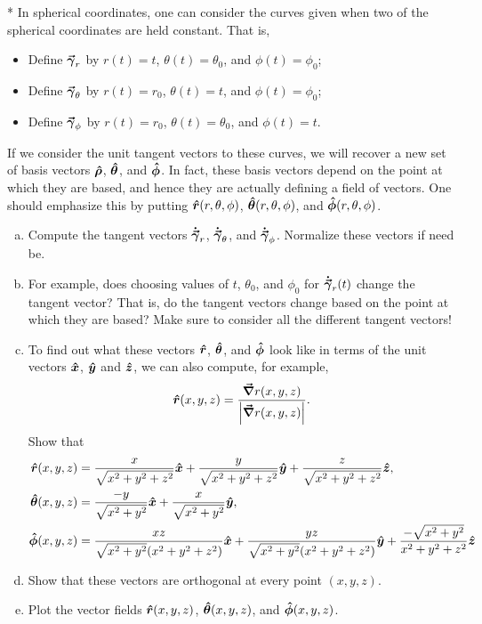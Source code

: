 \documentclass[12pt]{article} %
\begin{document}
\vspace*{1cm}
\begin{problem}
* In spherical coordinates, one can consider the curves given when two of the spherical coordinates are held constant.  That is, 
\begin{itemize}
    \item Define $\boldsymbol{\vec{\gamma}}_r$ by $r(t)=t$, $\theta(t)=\theta_0$, and $\phi(t)=\phi_0$;
    \item Define $\boldsymbol{\vec{\gamma}}_\theta$ by $r(t)=r_0$, $\theta(t)=t$, and $\phi(t)=\phi_0$;
    \item Define $\boldsymbol{\vec{\gamma}}_\phi$ by $r(t)=r_0$, $\theta(t)=\theta_0$, and $\phi(t)=t$.
\end{itemize}
If we consider the unit tangent vectors to these curves, we will recover a new set of basis vectors $\boldsymbol{\boldsymbol{\hat{\rho}}}$, $\boldsymbol{\boldsymbol{\hat{\theta}}}$, and $\boldsymbol{\boldsymbol{\hat{\phi}}}$.  In fact, these basis vectors depend on the point at which they are based, and hence they are actually defining a field of vectors.  One should emphasize this by putting $\boldsymbol{\boldsymbol{\hat{r}}}(r,\theta,\phi)$, $\boldsymbol{\boldsymbol{\hat{\theta}}}(r,\theta,\phi)$, and $\boldsymbol{\boldsymbol{\hat{\phi}}}(r,\theta,\phi)$.
\begin{enumerate}[(a)]
    \item Compute the tangent vectors $\boldsymbol{\dot{\vec{\gamma}}}_r$, $\boldsymbol{\dot{\vec{\gamma}}}_\theta$, and $\boldsymbol{\dot{\vec{\gamma}}}_\phi$.  Normalize these vectors if need be.
    \item For example, does choosing values of $t$, $\theta_0$, and $\phi_0$ for $\boldsymbol{\dot{\vec{\gamma}}}_r(t)$ change the tangent vector? That is, do the tangent vectors change based on the point at which they are based? Make sure to consider all the different tangent vectors!
    \item To find out what these vectors $\boldsymbol{\boldsymbol{\hat{r}}}$, $\boldsymbol{\boldsymbol{\hat{\theta}}}$, and $\boldsymbol{\boldsymbol{\hat{\phi}}}$ look like in terms of the unit vectors $\boldsymbol{\hat{x}}$, $\boldsymbol{\hat{y}}$ and $\boldsymbol{\hat{z}}$, we can also compute, for example,
    \[
    \boldsymbol{\boldsymbol{\hat{r}}}(x,y,z) = \frac{\boldsymbol{\vec{\nabla}} r(x,y,z)}{\left| \boldsymbol{\vec{\nabla}} r(x,y,z) \right|}.
    \]
    Show that
    \begin{align*}
        \boldsymbol{\boldsymbol{\hat{r}}}(x,y,z) &= \frac{x}{\sqrt{x^2+y^2+z^2}}\boldsymbol{\hat{x}} + \frac{y}{\sqrt{x^2+y^2+z^2}} \boldsymbol{\hat{y}} + \frac{z}{\sqrt{x^2+y^2+z^2}} \boldsymbol{\hat{z}},\\
        \boldsymbol{\boldsymbol{\hat{\theta}}}(x,y,z) &= \frac{-y}{\sqrt{x^2+y^2}} \boldsymbol{\hat{x}} + \frac{x}{\sqrt{x^2+y^2}} \boldsymbol{\hat{y}},\\
        \boldsymbol{\boldsymbol{\hat{\phi}}}(x,y,z) &= \frac{xz}{\sqrt{x^2+y^2}(x^2+y^2+z^2)}\boldsymbol{\hat{x}} + \frac{yz}{\sqrt{x^2+y^2}(x^2+y^2+z^2)}\boldsymbol{\hat{y}} + \frac{-\sqrt{x^2+y^2}}{x^2+y^2+z^2}\boldsymbol{\hat{z}}
    \end{align*}
    \item Show that these vectors are orthogonal at every point $(x,y,z)$.
    \item Plot the vector fields $\boldsymbol{\boldsymbol{\hat{r}}}(x,y,z)$, $\boldsymbol{\boldsymbol{\hat{\theta}}}(x,y,z)$, and $\boldsymbol{\boldsymbol{\hat{\phi}}}(x,y,z)$.
\end{enumerate}
\end{problem}
\end{document}
